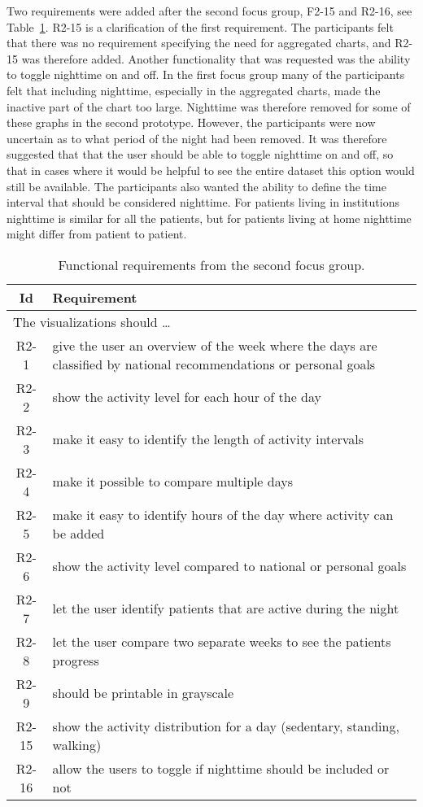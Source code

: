 Two requirements were added after the second focus group, F2-15 and R2-16, see Table~\ref{tab:f2Req}. R2-15 is a clarification of the first requirement. The participants felt that there was no requirement specifying the need for aggregated charts, and R2-15 was therefore added. Another functionality that was requested was the ability to toggle nighttime on and off. In the first focus group many of the participants felt that including nighttime, especially in the aggregated charts, made the inactive part of the chart too large. Nighttime was therefore removed for some of these graphs in the second prototype. However, the participants were now uncertain as to what period of the night had been removed. It was therefore suggested that that the user should be able to toggle nighttime on and off, so that in cases where it would be helpful to see the entire dataset this option would still be available. The participants also wanted the ability to define the time interval that should be considered  nighttime. For patients living in institutions nighttime is similar for all the patients, but for patients living at home nighttime might differ from patient to patient.

\begin{table}[h!]
  \begin{center}
  \begin{tabular}{|c|p{12cm}|}
    \hline
      \textbf{Id} & \textbf{Requirement} \\ \hline
    \multicolumn{2}{|l|}{The visualizations should \ldots} \\ \hline
      R2-1 & give the user an overview of the week where the days are classified by national recommendations or personal goals \\ \hline
      R2-2 & show the activity level for each hour of the day \\ \hline
      R2-3 & make it easy to identify the length of activity intervals \\ \hline
      R2-4 & make it possible to compare multiple days \\ \hline
      R2-5 & make it easy to identify hours of the day where activity can be added \\ \hline
      R2-6 & show the activity level compared to national or personal goals \\ \hline
      R2-7 & let the user identify patients that are active during the night \\ \hline
      R2-8 & let the user compare two separate weeks to see the patients progress \\ \hline
      R2-9 & should be printable in grayscale \\ \hline
      R2-15 & show the activity distribution for a day (sedentary, standing, walking) \\ \hline
      R2-16 & allow the users to toggle if nighttime should be included or not \\ \hline
  \end{tabular}
  \end{center}
  \caption{Functional requirements from the second focus group.}
  \label{tab:f2Req}
\end{table}

